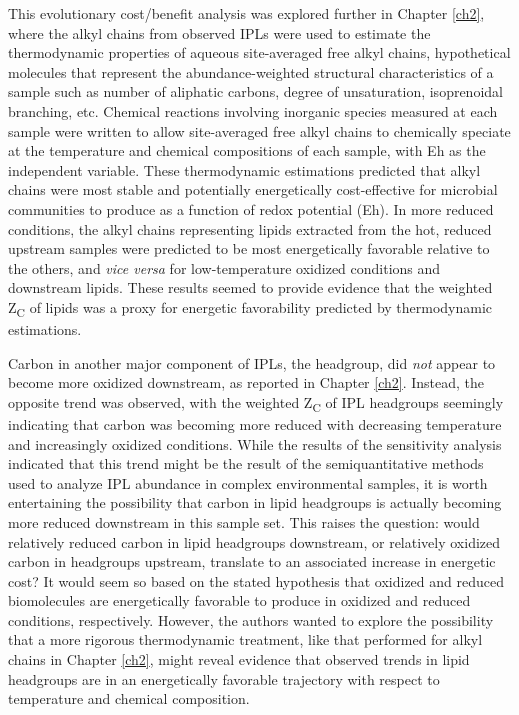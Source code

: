 This evolutionary cost/benefit analysis was explored further in Chapter \ref{ch2}, where the alkyl chains from observed IPLs were used to estimate the thermodynamic properties of aqueous site-averaged free alkyl chains, hypothetical molecules that represent the abundance-weighted structural characteristics of a sample such as number of aliphatic carbons, degree of unsaturation, isoprenoidal branching, etc. Chemical reactions involving inorganic species measured at each sample were written to allow site-averaged free alkyl chains to chemically speciate at the temperature and chemical compositions of each sample, with Eh as the independent variable. These thermodynamic estimations predicted that alkyl chains were most stable and potentially energetically cost-effective for microbial communities to produce as a function of redox potential (Eh). In more reduced conditions, the alkyl chains representing lipids extracted from the hot, reduced upstream samples were predicted to be most energetically favorable relative to the others, and \textit{vice versa} for low-temperature oxidized conditions and downstream lipids. These results seemed to provide evidence that the weighted Z\textsubscript{C} of lipids was a proxy for energetic favorability predicted by thermodynamic estimations.

Carbon in another major component of IPLs, the headgroup, did \textit{not} appear to become more oxidized downstream, as reported in Chapter \ref{ch2}. Instead, the opposite trend was observed, with the weighted Z\textsubscript{C} of IPL headgroups seemingly indicating that carbon was becoming more reduced with decreasing temperature and increasingly oxidized conditions. While the results of the sensitivity analysis indicated that this trend might be the result of the semiquantitative methods used to analyze IPL abundance in complex environmental samples, it is worth entertaining the possibility that carbon in lipid headgroups is actually becoming more reduced downstream in this sample set. This raises the question: would relatively reduced carbon in lipid headgroups downstream, or relatively oxidized carbon in headgroups upstream, translate to an associated increase in energetic cost? It would seem so based on the stated hypothesis that oxidized and reduced biomolecules are energetically favorable to produce in oxidized and reduced conditions, respectively. However, the authors wanted to explore the possibility that a more rigorous thermodynamic treatment, like that performed for alkyl chains in Chapter \ref{ch2}, might reveal evidence that observed trends in lipid headgroups are in an energetically favorable trajectory with respect to temperature and chemical composition.

